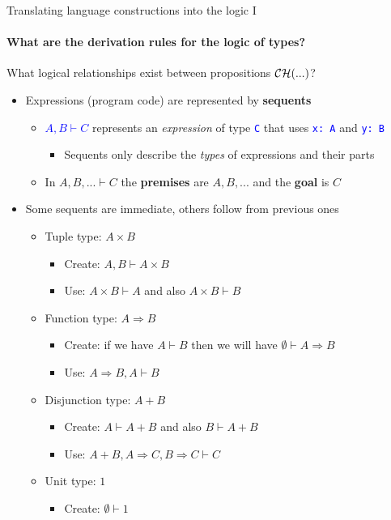 \documentclass[english]{beamer}
\begin{document}
\begin{frame}{Translating language constructions into the logic I}


\framesubtitle{What are the derivation rules for the logic of types?}

What logical relationships exist between propositions ${\cal CH}(...)$?
\begin{itemize}
\item Expressions (program code) are represented by \textbf{sequents}
\begin{itemize}
\item \textcolor{blue}{$A,B\vdash C$} represents an \emph{expression} of
type \texttt{\textcolor{blue}{\footnotesize{}C}} that uses \texttt{\textcolor{blue}{\footnotesize{}x:\ A}}
and \texttt{\textcolor{blue}{\footnotesize{}y:\ B}}{\footnotesize \par}
\begin{itemize}
\item Sequents only describe the \emph{types} of expressions and their parts
\end{itemize}
\item In $A,B,...\vdash C$ the \textbf{premises} are $A,B,...$ and the
\textbf{goal} is $C$
\end{itemize}
\item Some sequents are immediate, others follow from previous ones
\begin{itemize}
\item Tuple type: $A\times B$
\begin{itemize}
\item Create: $A,B\vdash A\times B$ 
\item Use: $A\times B\vdash A$ and also $A\times B\vdash B$
\end{itemize}
\item Function type: $A\Rightarrow B$
\begin{itemize}
\item Create: if we have $A\vdash B$ then we will have $\emptyset\vdash A\Rightarrow B$ 
\item Use: $A\Rightarrow B,A\vdash B$
\end{itemize}
\item Disjunction type: $A+B$
\begin{itemize}
\item Create: $A\vdash A+B$ and also $B\vdash A+B$
\item Use: $A+B,A\Rightarrow C,B\Rightarrow C\vdash C$
\end{itemize}
\item Unit type: $1$
\begin{itemize}
\item Create: $\emptyset\vdash1$
\end{itemize}
\end{itemize}
\end{itemize}
\end{frame}
\end{document}
